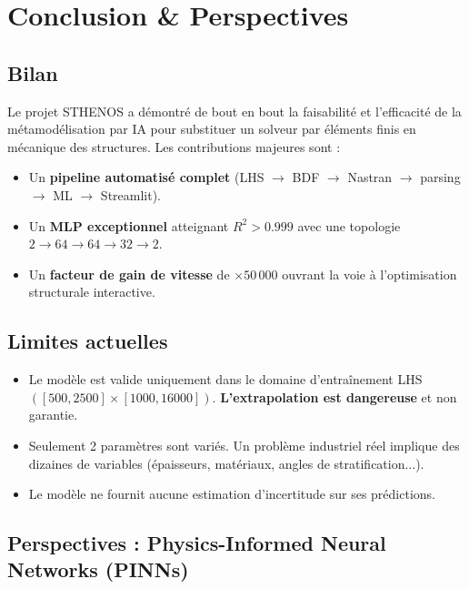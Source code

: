 \documentclass[journal, a4paper, twocolumn]{IEEEtran}
\begin{document}
\section{Conclusion \& Perspectives}

\subsection{Bilan}

Le projet STHENOS a démontré de bout en bout la faisabilité et l'efficacité de la métamodélisation par IA pour substituer un solveur par éléments finis en mécanique des structures. Les contributions majeures sont :
\begin{itemize}
    \item Un \textbf{pipeline automatisé complet} (LHS $\to$ BDF $\to$ Nastran $\to$ parsing $\to$ ML $\to$ Streamlit).
    \item Un \textbf{MLP exceptionnel} atteignant $R^2 > 0.999$ avec une topologie $2 \to 64 \to 64 \to 32 \to 2$.
    \item Un \textbf{facteur de gain de vitesse} de $\times 50\,000$ ouvrant la voie à l'optimisation structurale interactive.
\end{itemize}

\subsection{Limites actuelles}

\begin{itemize}
    \item Le modèle est valide uniquement dans le domaine d'entraînement LHS $([500,2500] \times [1000,16000])$. \textbf{L'extrapolation est dangereuse} et non garantie.
    \item Seulement 2 paramètres sont variés. Un problème industriel réel implique des dizaines de variables (épaisseurs, matériaux, angles de stratification...).
    \item Le modèle ne fournit aucune estimation d'incertitude sur ses prédictions.
\end{itemize}

\subsection{Perspectives : Physics-Informed Neural Networks (PINNs)}
\end{document}
